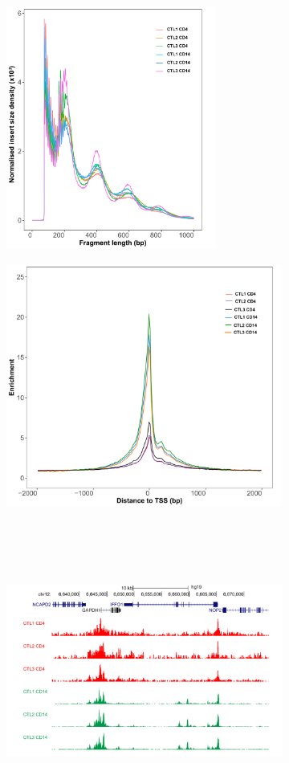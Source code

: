 \begin{figure}[htbp]
\centering
\begin{subfigure}{0.45\textwidth}
\centering
\includegraphics[height=8cm,width=\textwidth]{./Results1/pdfs/ATAC_Core_fresh_CD4_CD14_frag_size_distribution}
\caption{\textbf{}}
\end{subfigure}%
\begin{subfigure}{0.45\textwidth}
\centering
\includegraphics[height=8cm,width=\textwidth]{./Results1/pdfs/TSS_enrichment_Core_fresh_CD4_CD14}
\caption{\textbf{}}
\end{subfigure} \\
\hfill
\begin{subfigure}{0.45\textwidth}
\centering
\includegraphics[height=8cm,width=\textwidth]{./Results1/pdfs/ATAC_Core_CD4_CD14_fresh_GAPDH}

\end{subfigure}
\end{figure}
